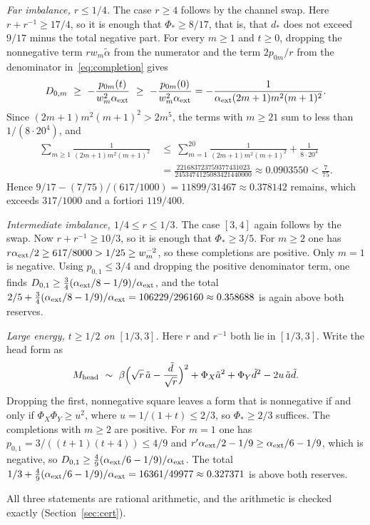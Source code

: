 \documentclass[10pt]{article}
\theoremstyle{remark}
\newcommand{\dstar}{d_{*}}
\begin{document}
\emph{Far imbalance, $r\le1/4$.} The case $r\ge4$ follows by the channel swap. Here $r+r^{-1}\ge17/4$, so it is enough that $\Phi_*\ge8/17$, that is, that $\dstar$ does not exceed $9/17$ minus the total negative part. For every $m\ge1$ and $t\ge0$, dropping the nonnegative term $rw_m\tilde\alpha$ from the numerator and the term $2p_{0m}/r$ from the denominator in~\eqref{eq:completion} gives
\[
D_{0,m}\ \ge\ -\frac{p_{0m}(t)}{w_m^2\alpha_{\rm ext}}\ \ge\ -\frac{p_{0m}(0)}{w_m^2\alpha_{\rm ext}}=-\frac1{\alpha_{\rm ext}(2m+1)m^2(m+1)^2}.
\]
Since $(2m+1)m^2(m+1)^2>2m^5$, the terms with $m\ge21$ sum to less than $1/(8\cdot20^4)$, and
\[
\begin{aligned}
\sum_{m\ge1}\frac1{(2m+1)m^2(m+1)^2}\ &\le\ \sum_{m=1}^{20}\frac1{(2m+1)m^2(m+1)^2}+\frac1{8\cdot20^4}\\
&=\frac{221683723759377431023}{2453474125083421440000}\approx0.0903550<\frac7{75}.
\end{aligned}
\]
Hence $9/17-(7/75)/(617/1000)=11899/31467\approx0.378142$ remains, which exceeds $317/1000$ and a fortiori $119/400$.

\emph{Intermediate imbalance, $1/4\le r\le1/3$.} The case $[3,4]$ again follows by the swap. Now $r+r^{-1}\ge10/3$, so it is enough that $\Phi_*\ge3/5$. For $m\ge2$ one has $r\alpha_{\rm ext}/2\ge617/8000>1/25\ge w_m^{-2}$, so these completions are positive. Only $m=1$ is negative. Using $p_{0,1}\le3/4$ and dropping the positive denominator term, one finds $D_{0,1}\ge\tfrac34(\alpha_{\rm ext}/8-1/9)/\alpha_{\rm ext}$, and the total $2/5+\tfrac34(\alpha_{\rm ext}/8-1/9)/\alpha_{\rm ext}=106229/296160\approx0.358688$ is again above both reserves.

\emph{Large energy, $t\ge1/2$ on $[1/3,3]$.} Here $r$ and $r^{-1}$ both lie in $[1/3,3]$. Write the head form as
\[
M_{\rm head}\ \sim\ \beta\Bigl(\sqrt r\,\tilde a-\frac{\tilde d}{\sqrt r}\Bigr)^2+\Phi_X\tilde a^2+\Phi_Y\tilde d^2-2u\,\tilde a\tilde d .
\]
Dropping the first, nonnegative square leaves a form that is nonnegative if and only if $\Phi_X\Phi_Y\ge u^2$, where $u=1/(1+t)\le2/3$, so $\Phi_*\ge2/3$ suffices. The completions with $m\ge2$ are positive. For $m=1$ one has $p_{0,1}=3/((t+1)(t+4))\le4/9$ and $r'\alpha_{\rm ext}/2-1/9\ge\alpha_{\rm ext}/6-1/9$, which is negative, so $D_{0,1}\ge\tfrac49(\alpha_{\rm ext}/6-1/9)/\alpha_{\rm ext}$. The total $1/3+\tfrac49(\alpha_{\rm ext}/6-1/9)/\alpha_{\rm ext}=16361/49977\approx0.327371$ is above both reserves.

All three statements are rational arithmetic, and the arithmetic is checked exactly (Section~\ref{sec:cert}).
\end{document}
